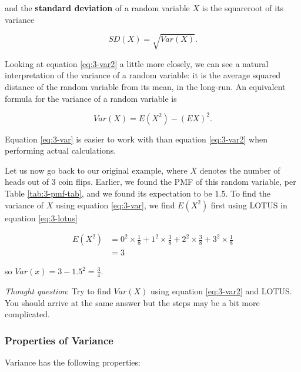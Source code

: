 \documentclass[
]{book}
\begin{document}
and the \textbf{standard deviation} of a random variable \(X\) is the squareroot of its variance

\begin{equation} 
SD(X) = \sqrt{Var(X)}.
\label{eq:3-sd}
\end{equation}

Looking at equation \eqref{eq:3-var2} a little more closely, we can see a natural interpretation of the variance of a random variable: it is the average squared distance of the random variable from its mean, in the long-run. An equivalent formula for the variance of a random variable is

\begin{equation} 
Var(X) = E(X^2) - (EX)^2.
\label{eq:3-var}
\end{equation}

Equation \eqref{eq:3-var} is easier to work with than equation \eqref{eq:3-var2} when performing actual calculations.

Let us now go back to our original example, where \(X\) denotes the number of heads out of 3 coin flips. Earlier, we found the PMF of this random variable, per Table \ref{tab:3-pmf-tab}, and we found its expectation to be 1.5. To find the variance of \(X\) using equation \eqref{eq:3-var}, we find \(E(X^2)\) first using LOTUS in equation \eqref{eq:3-lotus}

\[
\begin{split}
E(X^2) &= 0^2 \times \frac{1}{8} + 1^2 \times \frac{3}{8} + 2^2 \times \frac{3}{8} + 3^2 \times \frac{1}{8} \\
       &= 3
\end{split}
\]

so \(Var(x) = 3 - 1.5^2 = \frac{3}{4}\).

\emph{Thought question}: Try to find \(Var(X)\) using equation \eqref{eq:3-var2} and LOTUS. You should arrive at the same answer but the steps may be a bit more complicated.

\subsubsection{Properties of Variance}\label{var-prop}

Variance has the following properties:
\end{document}

